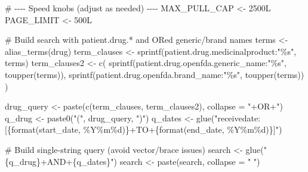 \documentclass[
  letterpaper,
  DIV=11,
  numbers=noendperiod]{scrartcl}
\newenvironment{Shaded}{\begin{snugshade}}{\end{snugshade}}
\newcommand{\AttributeTok}[1]{\textcolor[rgb]{0.40,0.45,0.13}{#1}}
\newcommand{\CommentTok}[1]{\textcolor[rgb]{0.37,0.37,0.37}{#1}}
\newcommand{\DecValTok}[1]{\textcolor[rgb]{0.68,0.00,0.00}{#1}}
\newcommand{\FunctionTok}[1]{\textcolor[rgb]{0.28,0.35,0.67}{#1}}
\newcommand{\NormalTok}[1]{\textcolor[rgb]{0.00,0.23,0.31}{#1}}
\newcommand{\OtherTok}[1]{\textcolor[rgb]{0.00,0.23,0.31}{#1}}
\newcommand{\StringTok}[1]{\textcolor[rgb]{0.13,0.47,0.30}{#1}}
\begin{document}
\begin{Shaded}
\begin{Highlighting}[]
\CommentTok{\# {-}{-}{-}{-} Speed knobs (adjust as needed) {-}{-}{-}{-}}
\NormalTok{MAX\_PULL\_CAP }\OtherTok{\textless{}{-}} \DecValTok{2500}\NormalTok{L}
\NormalTok{PAGE\_LIMIT   }\OtherTok{\textless{}{-}} \DecValTok{500}\NormalTok{L}

\CommentTok{\# Build search with patient.drug.* and OR\textquotesingle{}ed generic/brand names}
\NormalTok{terms }\OtherTok{\textless{}{-}} \FunctionTok{alias\_terms}\NormalTok{(drug)}
\NormalTok{term\_clauses  }\OtherTok{\textless{}{-}} \FunctionTok{sprintf}\NormalTok{(}\StringTok{\textquotesingle{}patient.drug.medicinalproduct:"\%s"\textquotesingle{}}\NormalTok{, terms)}
\NormalTok{term\_clauses2 }\OtherTok{\textless{}{-}} \FunctionTok{c}\NormalTok{(}
  \FunctionTok{sprintf}\NormalTok{(}\StringTok{\textquotesingle{}patient.drug.openfda.generic\_name:"\%s"\textquotesingle{}}\NormalTok{, }\FunctionTok{toupper}\NormalTok{(terms)),}
  \FunctionTok{sprintf}\NormalTok{(}\StringTok{\textquotesingle{}patient.drug.openfda.brand\_name:"\%s"\textquotesingle{}}\NormalTok{,   }\FunctionTok{toupper}\NormalTok{(terms))}
\NormalTok{)}

\NormalTok{drug\_query }\OtherTok{\textless{}{-}} \FunctionTok{paste}\NormalTok{(}\FunctionTok{c}\NormalTok{(term\_clauses, term\_clauses2), }\AttributeTok{collapse =} \StringTok{"+OR+"}\NormalTok{)}
\NormalTok{q\_drug     }\OtherTok{\textless{}{-}} \FunctionTok{paste0}\NormalTok{(}\StringTok{"("}\NormalTok{, drug\_query, }\StringTok{")"}\NormalTok{)}
\NormalTok{q\_dates    }\OtherTok{\textless{}{-}} \FunctionTok{glue}\NormalTok{(}\StringTok{"receivedate:[\{format(start\_date, \textquotesingle{}\%Y\%m\%d\textquotesingle{})\}+TO+\{format(end\_date, \textquotesingle{}\%Y\%m\%d\textquotesingle{})\}]"}\NormalTok{)}

\CommentTok{\# Build single{-}string query (avoid vector/brace issues)}
\NormalTok{search }\OtherTok{\textless{}{-}} \FunctionTok{glue}\NormalTok{(}\StringTok{"\{q\_drug\}+AND+\{q\_dates\}"}\NormalTok{)}
\NormalTok{search }\OtherTok{\textless{}{-}} \FunctionTok{paste}\NormalTok{(search, }\AttributeTok{collapse =} \StringTok{" "}\NormalTok{)}


\end{Highlighting}
\end{Shaded}
\end{document}

